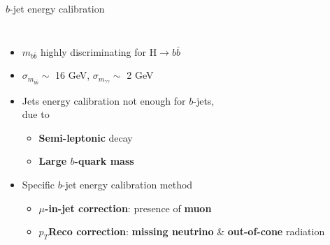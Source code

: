 \begin{frame}{$b$-jet energy calibration}
\begin{columns}
\begin{itemize}
    \item $m_{b\bar{b}}$ highly discriminating for H$\to b\bar{b}$
    \item $\sigma_{m_{b\bar{b}}}\sim$ 16 GeV, $\sigma_{m_{\gamma\gamma}}\sim$ 2 GeV
    \item Jets energy calibration not enough for $b$-jets,\\ due to 
    \begin{itemize}
        \item \textcolor{HHred}{\textbf{Semi-leptonic}} decay
        \item \textcolor{HHturquoise_d}{\textbf{Large $b$-quark mass}}
    \end{itemize}
\pause    
    \item Specific $b$-jet energy calibration method
    \begin{itemize}
        \item \textcolor{HHred}{\textbf{$\mu$-in-jet correction}}: presence of \textbf{muon} 
        \item \textcolor{HHturquoise_d}{\textbf{$p_T$Reco correction}}: \textbf{missing neutrino} \& \textbf{out-of-cone} radiation
    \end{itemize}
\end{itemize}
\end{columns}
\end{frame}

